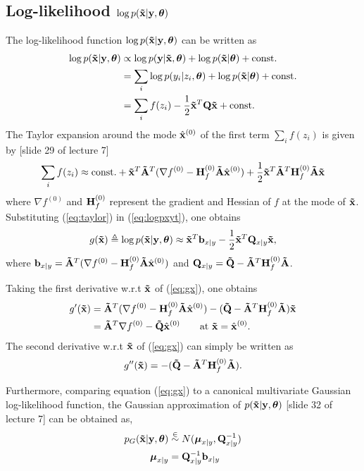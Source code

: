 \documentclass[a4paper,10pt]{article}
\def\bH{{\bf H}}
\def\bQ{{\bf Q}}
\def\btQ{{\bf \tilde Q}}
\def\btA{{\bf \tilde A}}
\def\bx{{\bf x}}
\def\bb{{\bf b}}
\def\by{{\bf y}}
\def\btx{{\bf{\tilde x}}}
\def\btheta{{\boldsymbol \theta}}
\def\bmu{{\boldsymbol \mu}}
\begin{document}
\subsection{Log-likelihood $\log p(\btx|\by, \btheta)$}
The log-likelihood function $\log p(\btx|\by, \btheta)$ can be written as
\begin{align}
 \log p(\btx|\by, \btheta) &\propto \log p(\by| \btx, \btheta) + \log p(\btx|\btheta) + \mathrm{const.} \nonumber \\
 &= \sum_i \log p(y_i|z_i, \btheta) + \log p(\btx|\btheta) + \mathrm{const.} \nonumber \\
 &= \sum_i f(z_i) - \frac{1}{2} \btx^T \bQ \btx  + \mathrm{const.}
 \label{eq:logpxyt}
\end{align}
The Taylor expansion around the mode $\hat \bx^{(0)}$ of the first term $\sum_i f(z_i)$ is given by [slide 29 of lecture 7]
\begin{equation}
 \sum_i f(z_i) \approx \mathrm{const.} + \btx^T \btA^T (\nabla f^{(0)} - \bH_f^{(0)} \btA \hat \bx^{(0)}) + \frac{1}{2} \btx^T \btA^T \bH_f^{(0)} \btA \btx
 \label{eq:taylor}
\end{equation}
where $\nabla f^{(0)}$ and $\bH_f^{(0)}$ represent the gradient and Hessian of $f$ at the mode of $\btx$.
Substituting (\ref{eq:taylor}) in (\ref{eq:logpxyt}), one obtains
\begin{equation}
 g(\btx) \triangleq \log p(\btx|\by, \btheta) \approx \btx^T \bb_{x|y} - \frac{1}{2} \btx^T \bQ_{x|y} \btx,
 \label{eq:gx}
\end{equation}
where $\bb_{x|y} = \btA^T (\nabla f^{(0)} - \bH_f^{(0)} \btA \hat \bx^{(0)})$ and $\bQ_{x|y} = \btQ - \btA^T \bH_f^{(0)} \btA$.

Taking the first derivative w.r.t $\btx$ of (\ref{eq:gx}), one obtains
\begin{align}
 g'(\btx) &= \btA^T (\nabla f^{(0)} - \bH_f^{(0)} \btA \hat \bx^{(0)}) - (\btQ - \btA^T \bH_f^{(0)} \btA) \btx \nonumber \\
	  &= \btA^T \nabla f^{(0)} - \btQ \hat \bx^{(0)} \qquad \mathrm{at~} \btx = \hat \bx^{(0)}.
\end{align}
The second derivative w.r.t $\btx$ of (\ref{eq:gx}) can simply be written as
\begin{equation}
 g''(\btx) = -(\btQ - \btA^T \bH_f^{(0)} \btA).
\end{equation}

Furthermore, comparing equation (\ref{eq:gx}) to a canonical multivariate Gaussian log-likelihood function, the Gaussian approximation of $p(\btx|\by, \btheta)$ [slide 32 of lecture 7] can be obtained as,
\begin{align}
 p_G(\btx|\by, \btheta) &\stackrel{\in}{\sim} N(\bmu_{x|y}, \bQ_{x|y}^{-1}) \nonumber \\
 \bmu_{x|y} &= \bQ_{x|y}^{-1} \bb_{x|y}
 \label{eq:pxygauss}
\end{align}
\end{document}

